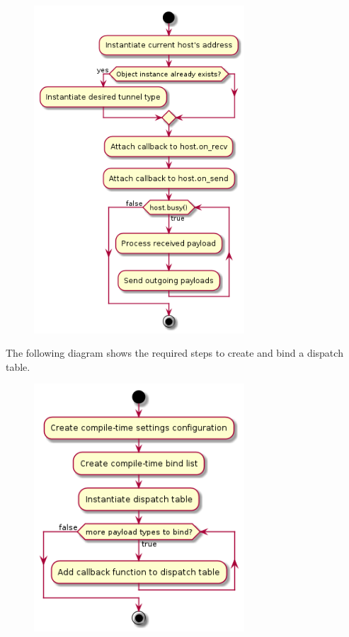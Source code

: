 \documentclass[12pt]{report}
\begin{document}
                \begin{figure}[H]
                \centering
                \includegraphics[width=0.7\textwidth]{d/ac/def_manhost.png}
                \end{figure}





                \newpage
                The following diagram shows the required steps to create and bind a dispatch table.

                \begin{figure}[H]
                \centering
                \includegraphics[width=0.7\textwidth]{d/ac/disptable.png}
                \end{figure}
\end{document}
